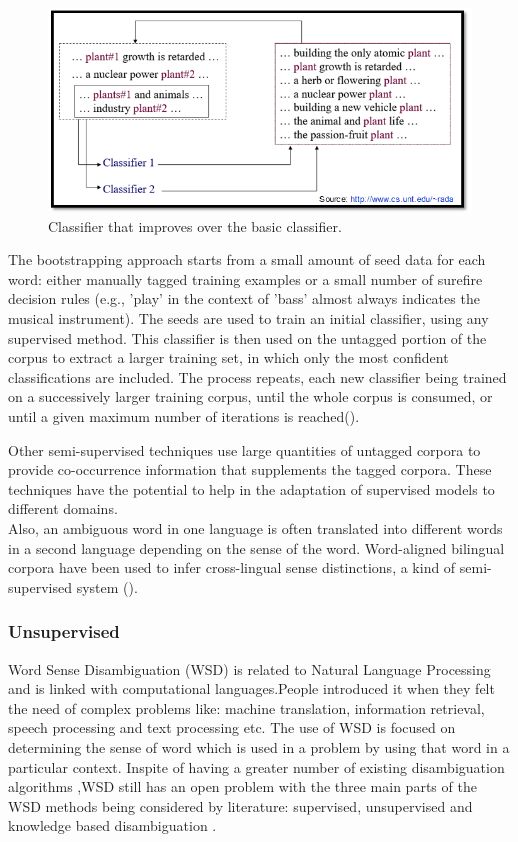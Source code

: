 \begin{figure}[tbh]
	\begin{center}
		\includegraphics[width=\columnwidth]{union(semi)}
	\end{center}
	\caption{Classifier that improves over the basic classifier. \label{fig3}}
\end{figure}

The bootstrapping approach starts from a small amount of seed data for each word: either manually tagged training examples or a small number of surefire decision rules (e.g., 'play' in the context of 'bass' almost always indicates the musical instrument). The seeds are used to train an initial classifier, using any supervised method. This classifier is then used on the untagged portion of the corpus to extract a larger training set, in which only the most confident classifications are included. The process repeats, each new classifier being trained on a successively larger training corpus, until the whole corpus is consumed, or until a given maximum number of iterations is reached(\cite{Blascheck2016}).

Other semi-supervised techniques use large quantities of untagged corpora to provide co-occurrence information that supplements the tagged corpora. These techniques have the potential to help in the adaptation of supervised models to different domains.\\
Also, an ambiguous word in one language is often translated into different words in a second language depending on the sense of the word. Word-aligned bilingual corpora have been used to infer cross-lingual sense distinctions, a kind of semi-supervised system (\cite{Cheslow2014}).

\subsubsection*{Unsupervised}
Word Sense Disambiguation (WSD) is related to Natural Language Processing and is linked with computational languages.People introduced it when they felt the need of complex problems like: machine translation, information retrieval, speech processing and text processing etc. The use of WSD is focused on determining the sense of word which is used in a problem by using that word in a particular context. Inspite of having a greater number of existing disambiguation algorithms ,WSD still has an open problem with the three main parts of the WSD methods being considered by literature: supervised, unsupervised and knowledge based disambiguation \cite{Guenther200312}.

